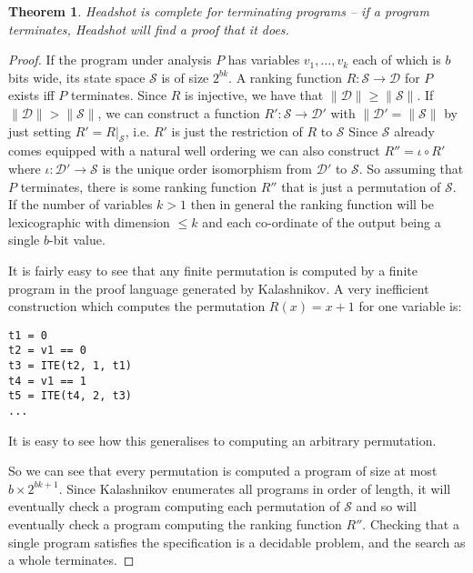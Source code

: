 \documentclass[preprint]{sigplanconf}
\newtheorem{theorem}{Theorem}
\theoremstyle{definition}
\begin{document}
\begin{theorem}
\label{thm:complete-termination}
 {\sc Headshot} is complete for terminating programs -- if a program terminates, {\sc Headshot} will find a proof that it does.
\end{theorem}

\begin{proof}
 If the program under analysis $P$ has variables $v_1, \ldots, v_k$ each of which is $b$ bits wide, its state space $\mathcal{S}$ is of size $2^{bk}$.
 A ranking function $R: \mathcal{S} \to \mathcal{D}$ for $P$ exists iff $P$ terminates.  Since $R$ is injective, we have that
 $\| \mathcal{D} \| \geq \| \mathcal{S} \|$.  If $\| \mathcal{D} \| > \| \mathcal{S} \|$, we can construct a function $R': \mathcal{S} \to \mathcal{D'}$
 with $ \| \mathcal{D'} = \| \mathcal{S} \|$ by just setting $R' = R|_\mathcal{S}$, i.e. $R'$ is just the restriction of $R$ to $\mathcal{S}$
 Since $\mathcal{S}$ already comes equipped with a natural well ordering we can also construct $R'' = \iota \circ R'$
 where $\iota: \mathcal{D'} \to \mathcal{S}$ is the unique order isomorphism from $\mathcal{D'}$ to $\mathcal{S}$.
 So assuming that $P$ terminates, there is some ranking function $R''$ that is just a permutation of $\mathcal{S}$.
 If the number of variables $k > 1$ then in general the ranking function will be lexicographic with dimension $\leq k$
 and each co-ordinate of the output being a single $b$-bit value.

 It is fairly easy to see that any finite permutation is computed by a finite program in the proof language generated
 by {\sc Kalashnikov}.  A very inefficient construction which computes the permutation $R(x) = x+1$ for one variable
 is:
 \begin{verbatim}
t1 = 0
t2 = v1 == 0
t3 = ITE(t2, 1, t1)
t4 = v1 == 1
t5 = ITE(t4, 2, t3)
...
 \end{verbatim}
It is easy to see how this generalises to computing an arbitrary permutation.

So we can see that every permutation is computed a program of size at most $b \times 2^{bk + 1}$.  Since
{\sc Kalashnikov} enumerates all programs in order of length, it will eventually check
a program computing each permutation of $\mathcal{S}$ and so will eventually check a program
computing the ranking function $R''$.  Checking that a single program satisfies the specification
is a decidable problem, and the search as a whole terminates.
\end{proof}
\end{document}
